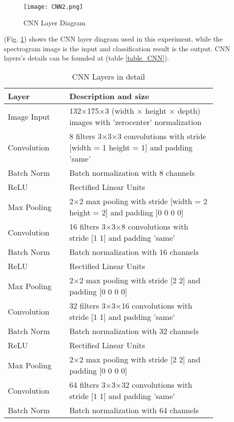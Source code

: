 \documentclass[conference]{IEEEtran}
\begin{document}
\begin{figure}[!htbp]
\centerline{\texttt{[image: CNN2.png]}}
\caption{CNN Layer Diagram}
\label{fig_CNN}
\end{figure}

(Fig. \ref{fig_CNN}) shows the CNN layer diagram used in this experiment, while the spectrogram image is the input and classification result is the output. CNN layers's details can be founded at (table \ref{table_CNN}).


\begin{table}[!htbp]
\centering
\caption{CNN Layers in detail}
\begin{tabularx}{0.48\textwidth}{p{0.25\linewidth} | p{0.6\linewidth}}
\hline
Layer  & Description and size  \\
\hline
 Image Input  & 132×175×3 (width × height × depth) images with 'zerocenter' normalization \\
Convolution           & 8 filters 3×3×3 convolutions with stride [width = 1  height = 1] and padding 'same' \\
Batch Norm   & Batch normalization with 8 channels \\
ReLU                  & Rectified Linear Units  \\
Max Pooling           & 2×2 max pooling with stride [width = 2  height = 2] and padding [0  0  0  0] \\
\hline
Convolution             & 16 filters 3×3×8 convolutions with stride [1  1] and padding 'same' \\
Batch Norm     & Batch normalization with 16 channels \\
ReLU                    & Rectified Linear Units  \\
Max Pooling             & 2×2 max pooling with stride [2  2] and padding [0  0  0  0] \\
\hline
Convolution             & 32 filters 3×3×16 convolutions with stride [1  1] and padding 'same' \\
Batch Norm     & Batch normalization with 32 channels \\
ReLU                    & Rectified Linear Units  \\
Max Pooling             & 2×2 max pooling with stride [2  2] and padding [0  0  0  0] \\
\hline
Convolution             & 64 filters 3×3×32 convolutions with stride [1  1] and padding 'same' \\
Batch Norm     & Batch normalization with 64 channels \\

\end{tabularx}
\end{table}
\end{document}
